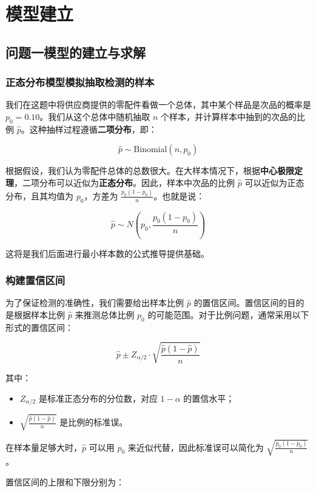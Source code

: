 \documentclass[utf8]{ctexart} %
\begin{document}
		\section{模型建立}
		\subsection{问题一模型的建立与求解}
		\subsubsection{正态分布模型模拟抽取检测的样本}
		我们在这题中将供应商提供的零配件看做一个总体，其中某个样品是次品的概率是 \( p_0 = 0.10 \)。我们从这个总体中随机抽取 \( n \) 个样本，并计算样本中抽到的次品的比例 \( \hat{p} \)。这种抽样过程遵循\textbf{二项分布}，即：
		
		\[
		\hat{p} \sim \text{Binomial}(n, p_0)
		\]
		
		根据假设，我们认为零配件总体的总数很大。在大样本情况下，根据\textbf{中心极限定理}，二项分布可以近似为\textbf{正态分布}。因此，样本中次品的比例 \( \hat{p} \) 可以近似为正态分布，且其均值为 \( p_0 \)，方差为 \( \frac{p_0(1 - p_0)}{n} \)。也就是说：
		
		\[
		\hat{p} \sim N\left(p_0, \frac{p_0(1 - p_0)}{n}\right)
		\]
		
		这将是我们后面进行最小样本数的公式推导提供基础。
		
		\subsubsection{构建置信区间}
		为了保证检测的准确性，我们需要给出样本比例 \( \hat{p} \) 的置信区间。置信区间的目的是根据样本比例 \( \hat{p} \) 来推测总体比例 \( p_0 \) 的可能范围。对于比例问题，通常采用以下形式的置信区间：
		
		\[
		\hat{p} \pm Z_{\alpha/2} \cdot \sqrt{\frac{\hat{p}(1 - \hat{p})}{n}}
		\]
		
		其中：
		\begin{itemize}
			\item \( Z_{\alpha/2} \) 是标准正态分布的分位数，对应 \( 1 - \alpha \) 的置信水平；
			\item \( \sqrt{\frac{\hat{p}(1 - \hat{p})}{n}} \) 是比例的标准误。
		\end{itemize}
		
		在样本量足够大时，\( \hat{p} \) 可以用 \( p_0 \) 来近似代替，因此标准误可以简化为 \( \sqrt{\frac{p_0(1 - p_0)}{n}} \)。
		
		置信区间的上限和下限分别为：
		
\end{document}
